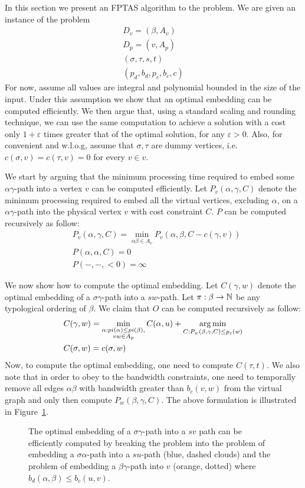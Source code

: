 In this section we present an FPTAS algorithm to the \VPN{} problem.
We are given an instance of the \VPN{} problem 
\begin{align*}
D_v = (\beta , A_v)		\\
D_p = (v, A_p)		\\
(\sigma , \tau , s, t)	\\
(p_d, b_d, p_c, b_c, c)
\end{align*}
For now, assume all values are integral and polynomial bounded in the size of
the input.
Under this assumption we show that an optimal embedding can be computed
efficiently.
We then argue that, using a standard scaling and rounding technique, we can use
the same computation to achieve a solution with a cost only
$1 + \varepsilon$ times greater that of the optimal solution, for any
$\varepsilon > 0$.
Also, for convenient and w.l.o.g, assume that $\sigma , \tau $ are dummy vertices, 
i.e. $c(\sigma , v) = c(\tau , v) = 0$ for every $v \in v$.

We start by arguing that the minimum processing time required to embed some
$\alpha \gamma $-path into a vertex $v$ can be computed efficiently.
Let $P_{v}(\alpha , \gamma , C)$ denote the minimum processing required to embed
all the virtual vertices, excluding $\alpha $, on a $\alpha \gamma $-path into the physical
vertex $v$ with cost constraint $C$.
$P$ can be computed recursively as follow:
\begin{align*}
&P_{v}(\alpha , \gamma , C) = 
\min_{\alpha \beta  \in A_v} P_{v}(\alpha , \beta , C - c(\gamma , v))
\\
&P(\alpha , \alpha , C) = 0
\\
&P(-, -, <0) = \infty
\end{align*}
 
We now show how to compute the optimal embedding.
Let $C(\gamma , w)$ denote the
optimal embedding of a $\sigma \gamma $-path into a $sw$-path.
Let $\pi:\beta  \to \mathbb{N}$ be any typological ordering of $\beta $. 
We claim that $O$ can be computed recursively as follow:
\begin{align*}
&C(\gamma , w) = 
\min_{\substack{
\alpha  : pi(\alpha ) \leq pi(\beta ), 
\\
vw \in A_p
}}
C(\alpha , u)
+
\operatorname*{arg\,min}_{C : P_{w}(\beta , \gamma , C) \leq p_c(w)}
\\
&C(\sigma , w) = c(\sigma , w)
\end{align*}
Now, to compute the optimal embedding, one need to compute $C(\tau , t)$. 
We also note that in order to obey to the bandwidth constraints, 
one need to temporally remove all edges $\alpha \beta $ with bandwidth greater than
$b_c(v, w)$ from the virtual graph and only then compute $P_{w}(\beta , \gamma , C)$.
The above formulation is illustrated in Figure~\ref{fig:dp1}.

\begin{figure}[ht]
\centering

\caption[]{
\label{fig:dp1}
The optimal embedding of a $\sigma \gamma $-path into a $sv$ path can be
efficiently computed by breaking the problem into the problem of embedding 
a $\sigma \alpha $-path into a $su$-path (blue, dashed clouds) 
and the problem of embedding a $\beta \gamma $-path into $v$ (orange, dotted) 
where $b_d(\alpha , \beta) \leq b_c(u, v)$.
}
\end{figure}
